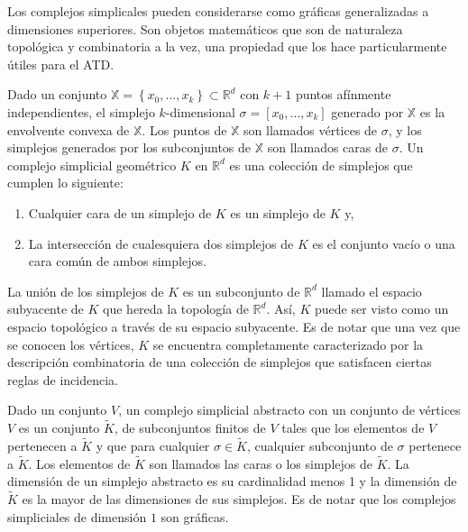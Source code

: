 Los complejos simplicales pueden considerarse como gr\'aficas generalizadas a dimensiones superiores.
Son objetos matem\'aticos que son de naturaleza topol\'ogica y combinatoria a la vez, una propiedad que
los hace particularmente \'utiles para el ATD.

Dado un conjunto $\mathbb{X} = \left\{x_{0}, \dots, x_{k}\right\}\subset\mathbb{R}^{d}$ con $k + 1$
puntos af\'inmente independientes, el simplejo $k$-dimensional
$\sigma = \left[x_{0}, \dots, x_{k}\right]$ generado por $\mathbb{X}$ es la envolvente convexa de
$\mathbb{X}$. Los puntos de $\mathbb{X}$ son llamados v\'ertices de $\sigma$, y los simplejos generados
por los subconjuntos de $\mathbb{X}$ son llamados caras de $\sigma$. Un complejo simplicial geom\'etrico
$K$ en $\mathbb{R}^{d}$ es una colecci\'on de simplejos que cumplen lo siguiente:

\begin{enumerate}[label=\roman*)]
    \item Cualquier cara de un simplejo de $K$ es un simplejo de $K$ y,
    
    \item La intersecci\'on de cualesquiera dos simplejos de $K$ es el conjunto vac\'io o una cara com\'un
    de ambos simplejos.
    
\end{enumerate}

La uni\'on de los simplejos de $K$ es un subconjunto de $\mathbb{R}^{d}$ llamado el espacio subyacente
de $K$ que hereda la topolog\'ia de $\mathbb{R}^{d}$. As\'i, $K$ puede ser visto como un espacio
topol\'ogico a trav\'es de su espacio subyacente. Es de notar que una vez que se conocen los v\'ertices,
$K$ se encuentra completamente caracterizado por la descripci\'on combinatoria de una colecci\'on de
simplejos que satisfacen ciertas reglas de incidencia.

Dado un conjunto $V$, un complejo simplicial abstracto con un conjunto de v\'ertices $V$ es un conjunto
$\tilde{K}$, de subconjuntos finitos de $V$ tales que los elementos de $V$ pertenecen a $\tilde{K}$ y
que para cualquier $\sigma \in \tilde{K}$, cualquier subconjunto de $\sigma$ pertenece a $\tilde{K}$.
Los elementos de $\tilde{K}$ son llamados las caras o los simplejos de $\tilde{K}$. La dimensi\'on
de un simplejo abstracto es su cardinalidad menos 1 y la dimensi\'on de $\tilde{K}$ es la mayor de las
dimensiones de sus simplejos. Es de notar que los complejos simpliciales de dimensi\'on $1$
son gr\'aficas.

